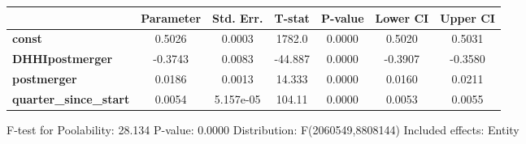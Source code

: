 \documentclass{report}
\begin{document}
\begin{center}
\begin{tabular}{lcccccc}
                               & \textbf{Parameter} & \textbf{Std. Err.} & \textbf{T-stat} & \textbf{P-value} & \textbf{Lower CI} & \textbf{Upper CI}  \\
\midrule
\textbf{const}                 &       0.5026       &       0.0003       &      1782.0     &      0.0000      &       0.5020      &       0.5031       \\
\textbf{DHHIpostmerger}        &      -0.3743       &       0.0083       &     -44.887     &      0.0000      &      -0.3907      &      -0.3580       \\
\textbf{postmerger}            &       0.0186       &       0.0013       &      14.333     &      0.0000      &       0.0160      &       0.0211       \\
\textbf{quarter\_since\_start} &       0.0054       &     5.157e-05      &      104.11     &      0.0000      &       0.0053      &       0.0055       \\
\bottomrule
\end{tabular}
\end{center}

F-test for Poolability: 28.134 \newline
 P-value: 0.0000 \newline
 Distribution: F(2060549,8808144) \newline
  \newline
 Included effects: Entity
\end{document}
